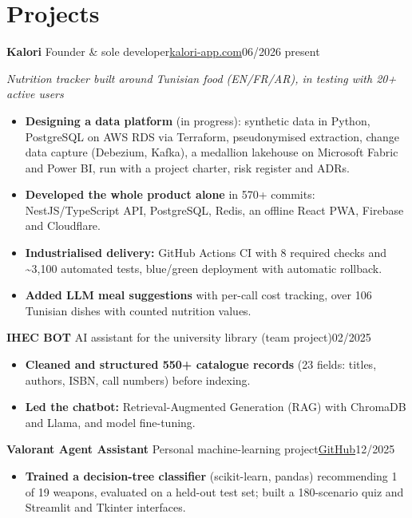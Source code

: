 \documentclass[10pt]{article}
\newcommand{\entry}[3]{\par\vspace{2pt}\textbf{#1}#2\hfill{\color{soft}#3}\par}
\newcommand{\sub}[1]{{\itshape\color{soft}#1\par}}
\newcommand{\sep}{\enspace\textperiodcentered\enspace}
\begin{document}
\section{Projects}
\entry{Kalori}{ \textendash{} Founder \& sole developer\sep \href{https://kalori-app.com}{kalori-app.com}}{06/2026 \textendash{} present}
\sub{Nutrition tracker built around Tunisian food (EN/FR/AR), in testing with 20+ active users}
\begin{itemize}
\item \textbf{Designing a data platform} (in progress): synthetic data in Python, PostgreSQL on AWS RDS via Terraform, pseudonymised extraction, change data capture (Debezium, Kafka), a medallion lakehouse on Microsoft Fabric and Power BI, run with a project charter, risk register and ADRs.
\item \textbf{Developed the whole product alone} in 570+ commits: NestJS/TypeScript API, PostgreSQL, Redis, an offline React PWA, Firebase and Cloudflare.
\item \textbf{Industrialised delivery:} GitHub Actions CI with 8 required checks and \textasciitilde{}3,100 automated tests, blue/green deployment with automatic rollback.
\item \textbf{Added LLM meal suggestions} with per-call cost tracking, over 106 Tunisian dishes with counted nutrition values.
\end{itemize}
\entry{IHEC BOT}{ \textendash{} AI assistant for the university library (team project)}{02/2025}
\begin{itemize}
\item \textbf{Cleaned and structured 550+ catalogue records} (23 fields: titles, authors, ISBN, call numbers) before indexing.
\item \textbf{Led the chatbot:} Retrieval-Augmented Generation (RAG) with ChromaDB and Llama, and model fine-tuning.
\end{itemize}
\entry{Valorant Agent Assistant}{ \textendash{} Personal machine-learning project\sep \href{https://github.com/AzizGh69/ValorantAgentAssistant}{GitHub}}{12/2025}
\begin{itemize}
\item \textbf{Trained a decision-tree classifier} (scikit-learn, pandas) recommending 1 of 19 weapons, evaluated on a held-out test set; built a 180-scenario quiz and Streamlit and Tkinter interfaces.
\end{itemize}
\end{document}
